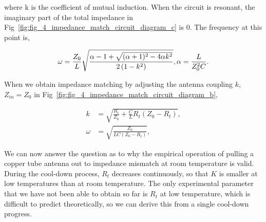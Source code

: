 where k is the coefficient of mutual induction. When the circuit is resonant, the imaginary part of the total impedance in Fig~\ref{fig:fig_4_impedance_match_circuit_diagram_c} is 0. The frequency at this point is,

\begin{equation}
    \omega=\frac{Z_0}{L} \sqrt{\frac{\alpha-1+\sqrt{(\alpha+1)^2-4 \alpha k^2}}{2\left(1-k^2\right)}},\ \\
    \alpha=\frac{L}{Z_0^2 C}.
\end{equation}

When we obtain impedance matching by adjusting the antenna coupling $k$, $Z_{in} = Z_0$ in Fig~\ref{fig:fig_4_impedance_match_circuit_diagram_b},

\begin{equation}
    \begin{aligned}
        k      & =\sqrt{\frac{R_t}{Z_0}+\frac{C}{L} R_t\left(Z_0-R_t\right)}, \\
        \omega & =\sqrt{\frac{Z_0}{L C(Z_0-R_t)}},
    \end{aligned}
\end{equation}

We can now answer the question as to why the empirical operation of pulling a copper tube antenna out to impedance mismatch at room temperature is valid. During the cool-down process, $R_t$ decreases continuously, so that $K$ is smaller at low temperatures than at room temperature. The only experimental parameter that we have not been able to obtain so far is $R_t$ at low temperature, which is difficult to predict theoretically, so we can derive this from a single cool-down progress.